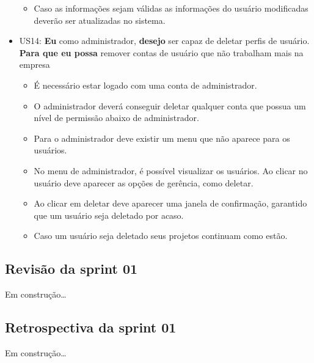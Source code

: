 \begin{itemize}
\begin{itemize}
    	\item Caso as informações sejam válidas as informações do usuário modificadas deverão ser atualizadas no sistema.
    \end{itemize}
        \item US14: \textbf{Eu} como administrador, \textbf{desejo} ser capaz de deletar perfis de usuário. \textbf{Para que eu possa} remover contas de usuário que não trabalham mais na empresa
    \begin{itemize}
    	\item É necessário estar logado com uma conta de administrador. 
    	\item O administrador deverá conseguir deletar qualquer conta que possua um nível de permissão abaixo de administrador.
    	\item Para o administrador deve existir um menu que não aparece para os usuários.
    	\item No menu de administrador, é possível visualizar os usuários. Ao clicar no usuário deve aparecer as opções de gerência, como deletar.
    	\item Ao clicar em deletar deve aparecer uma janela de confirmação, garantido que um usuário seja deletado por acaso.
    	\item Caso um usuário seja deletado seus projetos continuam como estão.
    \end{itemize}
  \end{itemize}
  


\subsection{Revisão da sprint 01}

  Em construção\ldots

\subsection{Retrospectiva da sprint 01}

  Em construção\ldots

